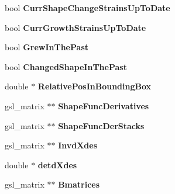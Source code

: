 \begin{DoxyCompactItemize}
\item 
\hypertarget{classShapeBase_a8bb52a406f331e6938694a4902bafb20}{}bool {\bfseries Curr\+Shape\+Change\+Strains\+Up\+To\+Date}\label{classShapeBase_a8bb52a406f331e6938694a4902bafb20}

\item 
\hypertarget{classShapeBase_a526231dcaa8d4a871e198284b4c4d9ff}{}bool {\bfseries Curr\+Growth\+Strains\+Up\+To\+Date}\label{classShapeBase_a526231dcaa8d4a871e198284b4c4d9ff}

\item 
\hypertarget{classShapeBase_ad7e1adfd2058cd5162816f9087a77c94}{}bool {\bfseries Grew\+In\+The\+Past}\label{classShapeBase_ad7e1adfd2058cd5162816f9087a77c94}

\item 
\hypertarget{classShapeBase_ac733487c1f89ed95f2fc2af960d933df}{}bool {\bfseries Changed\+Shape\+In\+The\+Past}\label{classShapeBase_ac733487c1f89ed95f2fc2af960d933df}

\item 
\hypertarget{classShapeBase_a57b594e048211647ba670710be0509f2}{}double $\ast$ {\bfseries Relative\+Pos\+In\+Bounding\+Box}\label{classShapeBase_a57b594e048211647ba670710be0509f2}

\item 
\hypertarget{classShapeBase_a80a8943320a0cdc871565acded52b239}{}gsl\+\_\+matrix $\ast$$\ast$ {\bfseries Shape\+Func\+Derivatives}\label{classShapeBase_a80a8943320a0cdc871565acded52b239}

\item 
\hypertarget{classShapeBase_a23deaddf67b09f6fe5470f05385001fe}{}gsl\+\_\+matrix $\ast$$\ast$ {\bfseries Shape\+Func\+Der\+Stacks}\label{classShapeBase_a23deaddf67b09f6fe5470f05385001fe}

\item 
\hypertarget{classShapeBase_a4a5fc631abba61fa2488112a7a674377}{}gsl\+\_\+matrix $\ast$$\ast$ {\bfseries Invd\+Xdes}\label{classShapeBase_a4a5fc631abba61fa2488112a7a674377}

\item 
\hypertarget{classShapeBase_ad1c2ef88314c7e567ca2bdcc6592f5ec}{}double $\ast$ {\bfseries detd\+Xdes}\label{classShapeBase_ad1c2ef88314c7e567ca2bdcc6592f5ec}

\item 
\hypertarget{classShapeBase_ace860a66508f503be2a46c351a9358c3}{}gsl\+\_\+matrix $\ast$$\ast$ {\bfseries Bmatrices}\label{classShapeBase_ace860a66508f503be2a46c351a9358c3}


\end{DoxyCompactItemize}

